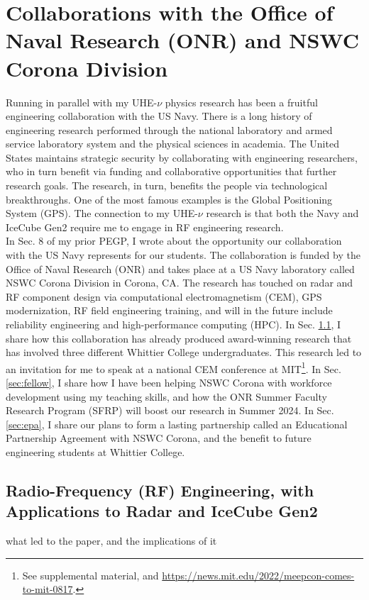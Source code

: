 \documentclass[../../../main.tex]{subfiles}
\begin{document}
\section{Collaborations with the Office of Naval Research (ONR) and NSWC Corona Division}
\label{sec:naval_research}

Running in parallel with my UHE-$\nu$ physics research has been a fruitful engineering collaboration with the US Navy.  There is a long history of engineering research performed through the national laboratory and armed service laboratory system and the physical sciences in academia.  The United States maintains strategic security by collaborating with engineering researchers, who in turn benefit via funding and collaborative opportunities that further research goals.  The research, in turn, benefits the people via technological breakthroughs.  One of the most famous examples is the Global Positioning System (GPS).  The connection to my UHE-$\nu$ research is that both the Navy and IceCube Gen2 require me to engage in RF engineering research.
\\
\vspace{0.25cm}
In Sec. 8 of my prior PEGP, I wrote about the opportunity our collaboration with the US Navy represents for our students.  The collaboration is funded by the Office of Naval Research (ONR) and takes place at a US Navy laboratory called NSWC Corona Division in Corona, CA.  The research has touched on radar and RF component design via computational electromagnetism (CEM), GPS modernization, RF field engineering training, and will in the future include reliability engineering and high-performance computing (HPC).  In Sec. \ref{sec:cem_paper}, I share how this collaboration has already produced award-winning research that has involved three different Whittier College undergraduates.  This research led to an invitation for me to speak at a national CEM conference at MIT\footnote{See supplemental material, and \url{https://news.mit.edu/2022/meepcon-comes-to-mit-0817}.}.  In Sec. \ref{sec:fellow}, I share how I have been helping NSWC Corona with workforce development using my teaching skills, and how the ONR Summer Faculty Research Program (SFRP) will boost our research in Summer 2024.  In Sec. \ref{sec:epa}, I share our plans to form a lasting partnership called an Educational Partnership Agreement with NSWC Corona, and the benefit to future engineering students at Whittier College.

\subsection{Radio-Frequency (RF) Engineering, with Applications to Radar and IceCube Gen2}
\label{sec:cem_paper}
what led to the paper, and the implications of it
\end{document}
